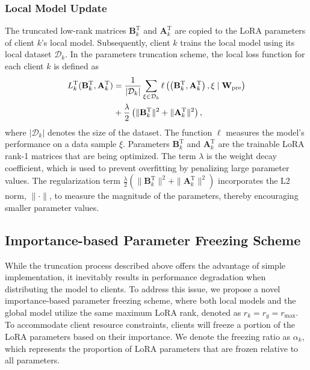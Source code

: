 \documentclass[journal]{IEEEtran}
\begin{document}
\subsubsection{Local Model Update} The truncated low-rank matrices \(\mathbf{B}_k^{\text{T}}\) and \(\mathbf{A}_k^{\text{T}}\) are copied to the LoRA parameters of client $k$'s local model. Subsequently, client $k$ trains the local model using its local dataset $\mathcal{D}_k$.
In the parameters truncation scheme, the local loss function for each client \(k\) is defined as
\begin{align}
L_k^{\text{T}}(\mathbf{B}_k^{\text{T}}, \mathbf{A}_k^{\text{T}}) &= \frac{1}{|\mathcal{D}_k|} \sum_{\xi \in \mathcal{D}_k} 
\ell\left(\left(\mathbf{B}_k^{\text{T}}, \mathbf{A}_k^{\text{T}}\right), \xi \mid 
\mathbf{W}_{\text{pre}}\right) \notag\\
&+\frac{\lambda}{2} \left( \|\mathbf{B}_k^{\text{T}}\|^2 + \|\mathbf{A}_k^{\text{T}}\|^2 \right),
\end{align}
where \(|\mathcal{D}_k|\) denotes the size of the dataset. The function \(\ell\) measures the model’s performance on a data sample \(\xi\). Parameters \(\mathbf{B}_k^{\text{T}}\) and \(\mathbf{A}_k^{\text{T}}\) are the trainable LoRA rank-1 matrices that are being optimized.
The term \(\lambda\) is the weight decay coefficient, which is used to prevent overfitting by penalizing large parameter values. The regularization term \(\frac{\lambda}{2} \left( \|\mathbf{B}_k^{\text{T}}\|^2 + \|\mathbf{A}_k^{\text{T}}\|^2 \right)\) incorporates the L2 norm, \(\|\cdot\|\), to measure the magnitude of the parameters, thereby encouraging smaller parameter values.


\subsection{Importance-based Parameter Freezing Scheme}
While the truncation process described above offers the advantage of simple implementation, it inevitably results in performance degradation when distributing the model to clients. To address this issue, we propose a novel importance-based parameter freezing scheme, where both local models and the global model utilize the same maximum LoRA rank, denoted as \(r_k = r_g = r_{\text{max}}\). To accommodate client resource constraints, clients will freeze a portion of the LoRA parameters based on their importance. We denote the freezing ratio as $\alpha_k$, which represents the proportion of LoRA parameters that are frozen relative to all parameters.
\end{document}
